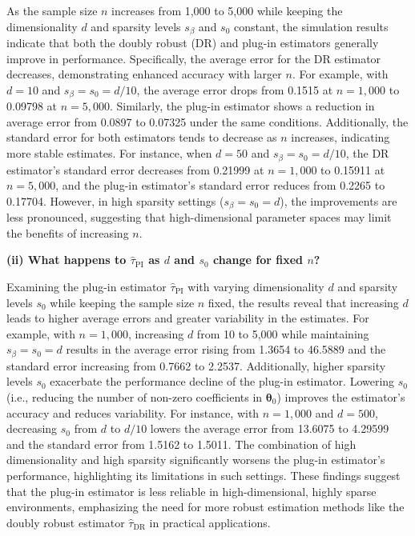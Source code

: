 \documentclass{article}
\begin{document}
As the sample size \( n \) increases from 1,000 to 5,000 while keeping the dimensionality \( d \) and sparsity levels \( s_\beta \) and \( s_0 \) constant, the simulation results indicate that both the doubly robust (DR) and plug-in estimators generally improve in performance. Specifically, the average error for the DR estimator decreases, demonstrating enhanced accuracy with larger \( n \). For example, with \( d = 10 \) and \( s_\beta = s_0 = d/10 \), the average error drops from 0.1515 at \( n = 1,000 \) to 0.09798 at \( n = 5,000 \). Similarly, the plug-in estimator shows a reduction in average error from 0.0897 to 0.07325 under the same conditions. Additionally, the standard error for both estimators tends to decrease as \( n \) increases, indicating more stable estimates. For instance, when \( d = 50 \) and \( s_\beta = s_0 = d/10 \), the DR estimator's standard error decreases from 0.21999 at \( n = 1,000 \) to 0.15911 at \( n = 5,000 \), and the plug-in estimator's standard error reduces from 0.2265 to 0.17704. However, in high sparsity settings (\( s_\beta = s_0 = d \)), the improvements are less pronounced, suggesting that high-dimensional parameter spaces may limit the benefits of increasing \( n \).

\textbf{(ii) What happens to \( \hat{\tau}_{\text{PI}} \) as \( d \) and \( s_0 \) change for fixed \( n \)?}

Examining the plug-in estimator \( \hat{\tau}_{\text{PI}} \) with varying dimensionality \( d \) and sparsity levels \( s_0 \) while keeping the sample size \( n \) fixed, the results reveal that increasing \( d \) leads to higher average errors and greater variability in the estimates. For example, with \( n = 1,000 \), increasing \( d \) from 10 to 5,000 while maintaining \( s_\beta = s_0 = d \) results in the average error rising from 1.3654 to 46.5889 and the standard error increasing from 0.7662 to 2.2537. Additionally, higher sparsity levels \( s_0 \) exacerbate the performance decline of the plug-in estimator. Lowering \( s_0 \) (i.e., reducing the number of non-zero coefficients in \( \boldsymbol{\theta}_0 \)) improves the estimator's accuracy and reduces variability. For instance, with \( n = 1,000 \) and \( d = 500 \), decreasing \( s_0 \) from \( d \) to \( d/10 \) lowers the average error from 13.6075 to 4.29599 and the standard error from 1.5162 to 1.5011. The combination of high dimensionality and high sparsity significantly worsens the plug-in estimator's performance, highlighting its limitations in such settings. These findings suggest that the plug-in estimator is less reliable in high-dimensional, highly sparse environments, emphasizing the need for more robust estimation methods like the doubly robust estimator \( \hat{\tau}_{\text{DR}} \) in practical applications.
\end{document}
